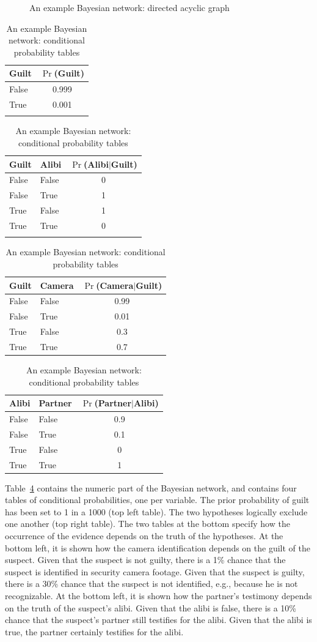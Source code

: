 \documentclass[10pt]{article}
\begin{document}
\begin{figure}[t]
\centering

\caption{An example Bayesian network: directed acyclic graph\label{fig:BN}}
\end{figure}

\begin{table}
	\centering
		\begin{tabular}{lc}
			Guilt & $\Pr$(Guilt)\\
			\hline
			False & 0.999\\
			True & 0.001\\
			& 
		\end{tabular}
		\quad
		\quad
		\quad
		\quad
		\quad
		\quad
		\quad
		\begin{tabular}{llc}
			Guilt &Alibi& $\Pr$(Alibi$|$Guilt)\\
			\hline
			False & False & 0\\
			False & True & 1\\
			True & False & 1\\
			True & True & 0\\
			& & 
		\end{tabular}
		\begin{tabular}{llc}
			Guilt &Camera& $\Pr$(Camera$|$Guilt)\\
			\hline
			False & False & 0.99\\
			False & True & 0.01\\
			True & False & 0.3\\
			True & True & 0.7\\
		\end{tabular}
		\quad
		\begin{tabular}{llc}
			Alibi &Partner& $\Pr$(Partner$|$Alibi)\\
			\hline
			False & False & 0.9\\
			False & True & 0.1\\
			True & False & 0\\
			True & True & 1\\
		\end{tabular}
\caption{An example Bayesian network: conditional probability tables\label{tab:BN}}
\end{table}

Table~\ref{tab:BN} contains the numeric part of the Bayesian network, and contains four tables of conditional probabilities, one per variable. The prior probability of guilt has been set to 1 in a 1000 (top left table). The two hypotheses logically exclude one another (top right table). 
The two tables at the bottom specify how the occurrence of the evidence depends on the truth of the hypotheses. At the bottom left, it is shown how the camera identification depends on the guilt of the suspect. Given that the suspect is not guilty, there is a 1\% chance that the suspect is identified in security camera footage. Given that the suspect is guilty, there is a 30\% chance that the suspect is not identified, e.g., because he is not recognizable. At the bottom left, it is shown how the partner's testimony depends on the truth of the suspect's alibi. Given that the alibi is false, there is a 10\% chance that the suspect's partner still testifies for the alibi. Given that the alibi is true, the partner certainly testifies for the alibi.
\end{document}
